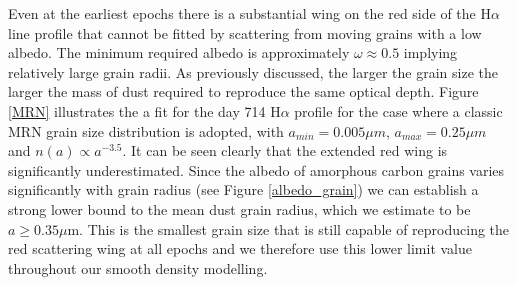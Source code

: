 \documentclass[useAMS,usenatbib,usegraphicx]{mnras}
\begin{document}
Even at the earliest epochs there is a substantial wing on the red side of 
the H$\alpha$ line profile that cannot be fitted by scattering from moving grains with a low albedo.  The 
minimum required albedo is approximately $\omega \approx 0.5$ implying relatively large grain radii.  As previously discussed, the larger 
the grain size the larger the mass of dust required to reproduce the same 
optical depth.  Figure \ref{MRN} illustrates the 
a fit for the day 714 H$\alpha$ profile for the case where a classic MRN \citep{Mathis1977} grain size 
distribution is adopted, with $a_{min}=0.005 \mu m$, $a_{max}=0.25 \mu m$ 
and $n(a) \propto a^{-3.5}$.  It can be seen clearly that the extended red wing is 
significantly underestimated.  Since the albedo of  
amorphous carbon grains varies significantly with grain radius (see Figure \ref{albedo_grain}) we can establish a strong 
lower bound to the mean dust grain radius, which we estimate to be $a \ge 0.35\mu$m.  This is the smallest grain size that is still 
capable of reproducing the red scattering wing at all epochs and we 
therefore use this lower limit value throughout our smooth density modelling.
\end{document}
